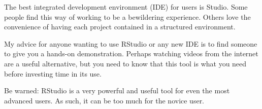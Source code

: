The best integrated development environment (IDE) for \R{} users is \R{} Studio. Some people find this way of working to be a bewildering experience. Others love the convenience of having each project contained in a structured environment.

My advice for anyone wanting to use RStudio or any new IDE is to find someone to give you a hands-on demonstration. Perhaps watching videos from the internet are a useful alternative, but you need to know that this tool is what you need before investing time in its use.

Be warned: RStudio is a very powerful and useful tool for even the most advanced \R{} users. As such, it can be too much for the novice \R{} user.




